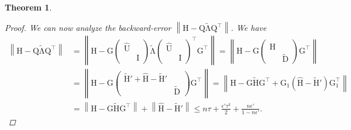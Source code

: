 \documentclass{article}
\newcommand{\lnorm}{\left\|}
\newcommand{\rnorm}{\right\|}
\newtheorem{theorem}{Theorem}[section]
\newcommand\matG{\boldsymbol{\mathrm{G}}}
\newcommand\matH{\boldsymbol{\mathrm{H}}}
\newcommand\matI{\boldsymbol{\mathrm{I}}}
\newcommand\matQ{\boldsymbol{\mathrm{Q}}}
\newcommand\matDtilde{\widetilde{\boldsymbol{\mathrm{D}}}}
\newcommand\matHtilde{\widetilde{\boldsymbol{\mathrm{H}}}}
\newcommand\matLambdatilde{\widetilde{\boldsymbol{\mathrm{\Lambda}}}}
\newcommand\matHhat{\widehat{\boldsymbol{\mathrm{H}}}}
\newcommand\matUhat{\widehat{\boldsymbol{\mathrm{U}}}}
\begin{document}
\begin{theorem}
\begin{proof}
        We can now analyze the backward-error $\lnorm \matH-\matQ\matLambdatilde\matQ^\top\rnorm$. We have
        \begingroup
        \allowdisplaybreaks
        \begin{align*}
            \lnorm
                \matH-\matQ\matLambdatilde\matQ^\top
            \rnorm
            &=
            \lnorm
                \matH-\matG\begin{pmatrix}
                \matUhat & \\
                 & \matI
            \end{pmatrix}\matLambdatilde
            \begin{pmatrix}
                \matUhat & \\
                 & \matI
            \end{pmatrix}^\top \matG^\top
            \rnorm
            =
            \lnorm
                \matH-\matG\begin{pmatrix}
                \matHhat & \\
                 & \matDtilde            
            \end{pmatrix} \matG^\top
            \rnorm
            \\
            &=
            \lnorm
                \matH-\matG\begin{pmatrix}
                \matHtilde'+\matHhat-\matHtilde' & \\
                 & \matDtilde            
            \end{pmatrix} \matG^\top
            \rnorm
            =
            \lnorm
                \matH-\matG\matHtilde\matG^\top
                +
                \matG_1
                (\matHhat-\matHtilde')\matG_1^\top
            \rnorm
            \\
            &=
            \lnorm
                \matH-\matG\matHtilde\matG^\top
            \rnorm
            +
            \lnorm
                \matHhat-\matHtilde'
            \rnorm
            \leq
            n\tau 
            + 
            \frac{\epsilon'\tau^3}{2} + \frac{n\epsilon'}{1-n\epsilon'}.
        \end{align*}
        \endgroup


\end{proof}
\end{theorem}
\end{document}
